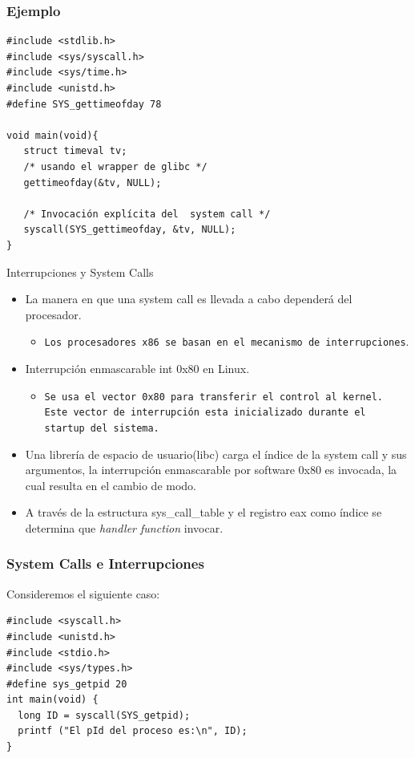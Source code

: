 \begin{frame}[fragile]
\frametitle{Ejemplo}
\begin{lstlisting}
#include <stdlib.h>
#include <sys/syscall.h>
#include <sys/time.h>
#include <unistd.h>
#define SYS_gettimeofday 78

void main(void){
   struct timeval tv;
   /* usando el wrapper de glibc */
   gettimeofday(&tv, NULL);

   /* Invocación explícita del  system call */
   syscall(SYS_gettimeofday, &tv, NULL);
}
\end{lstlisting}
\end{frame}


\begin{frame}{Interrupciones y System Calls}
  \begin{itemize}
    \item La manera en que una system call es llevada a cabo dependerá del procesador.
      \begin{itemize}
	    \item \texttt{Los procesadores x86 se basan en el mecanismo de interrupciones}.
	\end{itemize}  
    
   \item Interrupción enmascarable int 0x80 en Linux.
   \begin{itemize}  
   \item \texttt{Se usa el vector 0x80 para transferir el control al kernel. Este vector de interrupción esta inicializado durante el startup del sistema.}
 \end{itemize}
    \item Una librería de espacio de usuario(libc) carga el índice de la system call y sus argumentos, la interrupción enmascarable por software 	0x80 es invocada, la cual resulta en el cambio de modo.	
   \item A través de la estructura sys\_call\_table y el registro eax como índice se determina que \emph{handler function} invocar.
  \end{itemize}
\end{frame}

\begin{frame}[fragile]
\frametitle{System Calls e Interrupciones}
Consideremos el siguiente caso:
\begin{lstlisting}
#include <syscall.h>
#include <unistd.h>
#include <stdio.h>
#include <sys/types.h>
#define sys_getpid 20
int main(void) {
  long ID = syscall(SYS_getpid);
  printf ("El pId del proceso es:\n", ID);
}
\end{lstlisting}
\end{frame}

